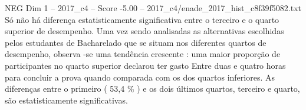 \begin{textsample}{NEG Dim 1 – 2017\_c4 – Score -5.00 – 2017\_c4/enade\_2017\_hist\_c8f39f5082.txt}
Só não há diferença estatisticamente significativa entre o terceiro e o quarto superior de desempenho.
Uma vez sendo analisadas as alternativas escolhidas pelos estudantes de Bacharelado que se situam nos diferentes quartos de desempenho, observa -se uma tendência crescente : uma maior proporção de participantes no quarto superior declarou ter gasto Entre duas e quatro horas para concluir a prova quando comparada com os dos quartos inferiores.
As diferenças entre o primeiro ( 53,4 \% ) e os dois últimos quartos, terceiro e quarto, são estatisticamente significativas.

\end{textsample}
